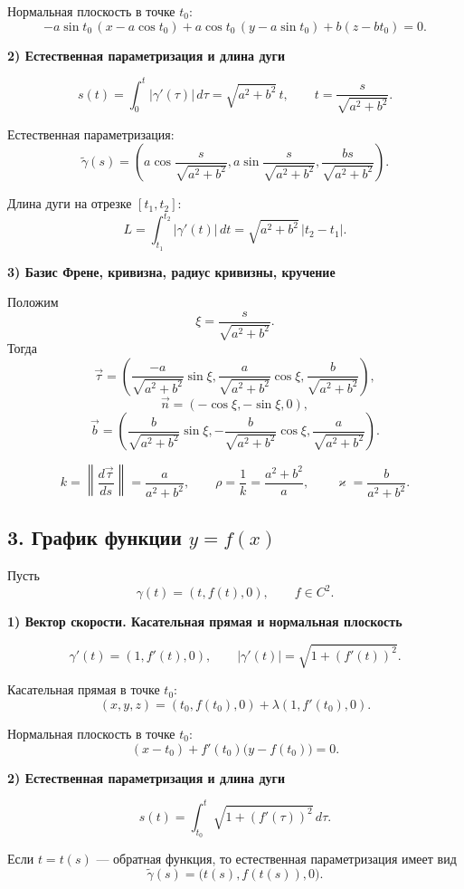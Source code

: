 \documentclass[12pt,a4paper]{article}
\begin{document}
Нормальная плоскость в точке $t_0$:
\[
-a\sin t_0\,(x-a\cos t_0) + a\cos t_0\,(y-a\sin t_0) + b(z-bt_0) = 0.
\]

\textbf{2) Естественная параметризация и длина дуги}

\[
s(t) = \int_0^t |\gamma'(\tau)|\,d\tau = \sqrt{a^2+b^2}\,t,
\qquad
t = \frac{s}{\sqrt{a^2+b^2}}.
\]

Естественная параметризация:
\[
\tilde{\gamma}(s) = \left(
a\cos \frac{s}{\sqrt{a^2+b^2}},
a\sin \frac{s}{\sqrt{a^2+b^2}},
\frac{bs}{\sqrt{a^2+b^2}}
\right).
\]

Длина дуги на отрезке $[t_1,t_2]$:
\[
L = \int_{t_1}^{t_2} |\gamma'(t)|\,dt = \sqrt{a^2+b^2}\,|t_2-t_1|.
\]

\textbf{3) Базис Френе, кривизна, радиус кривизны, кручение}

Положим
\[
\xi = \frac{s}{\sqrt{a^2+b^2}}.
\]
Тогда
\[
\vec{\tau} = \left(
\frac{-a}{\sqrt{a^2+b^2}}\sin \xi,
\frac{a}{\sqrt{a^2+b^2}}\cos \xi,
\frac{b}{\sqrt{a^2+b^2}}
\right),
\]
\[
\vec{n} = (-\cos \xi, -\sin \xi, 0),
\]
\[
\vec{b} = \left(
\frac{b}{\sqrt{a^2+b^2}}\sin \xi,
-\frac{b}{\sqrt{a^2+b^2}}\cos \xi,
\frac{a}{\sqrt{a^2+b^2}}
\right).
\]

\[
k = \left\| \frac{d\vec{\tau}}{ds} \right\| = \frac{a}{a^2+b^2}, \qquad
\rho = \frac{1}{k} = \frac{a^2+b^2}{a}, \qquad
\varkappa = \frac{b}{a^2+b^2}.
\]

\subsection*{3. График функции $y=f(x)$}

Пусть
\[
\gamma(t) = (t, f(t), 0), \qquad f \in C^2.
\]

\textbf{1) Вектор скорости. Касательная прямая и нормальная плоскость}

\[
\gamma'(t) = (1, f'(t), 0), \qquad |\gamma'(t)| = \sqrt{1 + (f'(t))^2}.
\]

Касательная прямая в точке $t_0$:
\[
(x,y,z) = (t_0, f(t_0), 0) + \lambda(1, f'(t_0), 0).
\]

Нормальная плоскость в точке $t_0$:
\[
(x-t_0) + f'(t_0)\bigl(y-f(t_0)\bigr) = 0.
\]

\textbf{2) Естественная параметризация и длина дуги}

\[
s(t) = \int_{t_0}^{t} \sqrt{1 + (f'(\tau))^2}\,d\tau.
\]

Если $t=t(s)$ --- обратная функция, то естественная параметризация имеет вид
\[
\tilde{\gamma}(s) = \bigl(t(s), f(t(s)), 0\bigr).
\]
\end{document}
